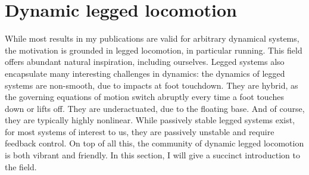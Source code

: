 
\section{Dynamic legged locomotion}
While most results in my publications are valid for arbitrary dynamical systems, the motivation is grounded in legged locomotion, in particular running. This field offers abundant natural inspiration, including ourselves. Legged systems also encapsulate many interesting challenges in dynamics: the dynamics of legged systems are non-smooth, due to impacts at foot touchdown. They are hybrid, as the governing equations of motion switch abruptly every time a foot touches down or lifts off. They are underactuated, due to the floating base. And of course, they are typically highly nonlinear. While passively stable legged systems exist, for most systems of interest to us, they are passively unstable and require feedback control.
On top of all this, the community of dynamic legged locomotion is both vibrant and friendly. In this section, I will give a succinct introduction to the field.

